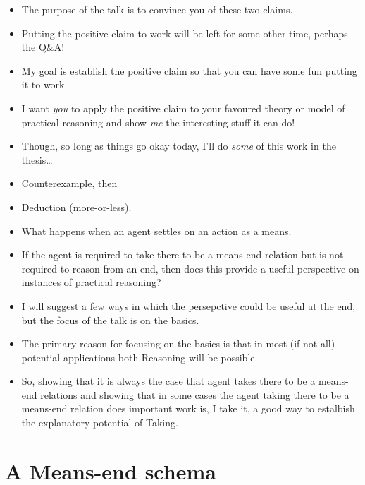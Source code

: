 \documentclass[10pt]{article}
\newcommand{\hozlinedash}[0]{%
  \noindent\hdashrule[0.5ex][c]{\textwidth}{.1pt}{2.5pt}
}
\newcommand{\schemaName}[1]{\textsf{#1}}
\begin{document}
\hozlinedash

\begin{itemize}[noitemsep]
\item The purpose of the talk is to convince you of these two claims.
\item Putting the positive claim to work will be left for some other time, perhaps the Q\&A!
\item My goal is establish the positive claim so that you can have some fun putting it to work.
\item I want \emph{you} to apply the positive claim to your favoured theory or model of practical reasoning and show \emph{me} the interesting stuff it can do!
\item Though, so long as things go okay today, I'll do \emph{some} of this work in the thesis\dots
\end{itemize}

\hozlinedash

\begin{itemize}[noitemsep]
\item Counterexample, then
\item Deduction (more-or-less).
\end{itemize}


\begin{itemize}
\item What happens when an agent settles on an action as a means.
\item If the agent is required to take there to be a means-end relation but is not required to reason from an end, then does this provide a useful perspective on instances of practical reasoning?
\item I will suggest a few ways in which the persepctive could be useful at the end, but the focus of the talk is on the basics.
\item The primary reason for focusing on the basics is that in most (if not all) potential applications both \schemaName{Reasoning} will be possible.
\item So, showing that it is always the case that agent takes there to be a means-end relations and showing that in some cases the agent taking there to be a means-end relation does important work is, I take it, a good way to estalbish the explanatory potential of \schemaName{Taking}.
\end{itemize}


\newpage

\section{A Means-end schema}
\label{sec:means-end-schema}
\end{document}
